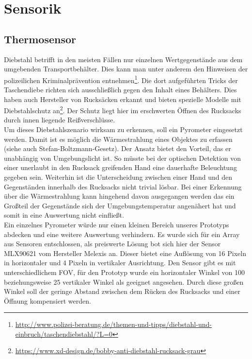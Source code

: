 \documentclass{sigchi}
\begin{document}
\section{Sensorik}

\subsection{Thermosensor}
Diebstahl betrifft in den meisten Fällen nur einzelnen Wertgegenstände aus dem umgebenden Transportbehälter. Dies kann man unter anderem den Hinweisen der polizeilichen Kriminalprävention entnehmen\footnote{\url{http://www.polizei-beratung.de/themen-und-tipps/diebstahl-und-einbruch/taschendiebstahl/?L=0}}. Die dort aufgeführten Tricks der Taschendiebe richten sich ausschließlich gegen den Inhalt eines Behälters. Dies haben auch Hersteller von Rucksäcken erkannt und bieten spezielle Modelle mit Diebstahlschutz an\footnote{\url{https://www.xd-design.de/bobby-anti-diebstahl-rucksack-grau}}. Der Schutz liegt hier im erschwerten Öffnen des Rucksacks durch innen liegende Reißverschlüsse.\\
Um dieses Diebstahlszenario wirksam zu erkennen, soll ein Pyrometer eingesetzt werden. Damit ist es möglich die Wärmestrahlung eines Objektes zu erfassen (siehe auch Stefan-Boltzmann-Gesetz). Der Ansatz bietet den Vorteil, das er unabhängig von Umgebungslicht ist. So müsste bei der optischen Detektion von einer unerlaubt in den Rucksack greifenden Hand eine dauerhafte Beleuchtung gegeben sein. Weiterhin ist die Unterscheidung zwischen einer Hand und den Gegenständen innerhalb des Rucksacks nicht trivial lösbar. Bei einer Erkennung über die Wärmestrahlung kann hingehend davon ausgegangen werden das ein Großteil der Gegenstände sich der Umgebungstemperatur angenähert hat und somit in eine Auswertung nicht einfließt.\\
Ein einzelnes Pyrometer würde nur einen kleinen Bereich unseres Prototyps abdecken und eine weitere Auswertung verhindern. Es wurde sich für ein Array aus Sensoren entschlossen, als preiswerte Lösung bot sich hier der Sensor MLX90621 vom Hersteller Melexis an. Dieser bietet eine Auflösung von 16 Pixeln in horizontaler und 4 Pixeln in vertikaler Ausrichtung. Den Sensor gibt es mit unterschiedlichem \gls{FOV}, für den Prototyp wurde ein horizontaler Winkel von 100\textdegree{} beziehungsweise 25\textdegree{} vertikaler Winkel als geeignet angesehen. Durch diese großen Winkel soll der geringe Abstand zwischen dem Rücken des Rucksacks und einer Öffnung kompensiert werden.\\
\end{document}
